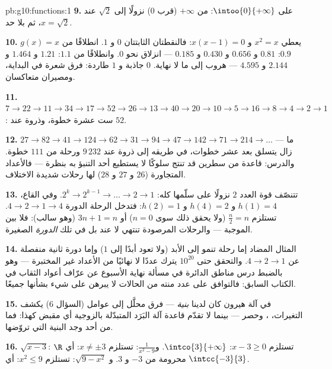 \begin{solution}{pb:g10:functions:1}
\textbf{9.} على $\intoo{0}{+\infty}$:  من
$+\infty$ (قرب $0$) نزولًا إلى  $\sqrt2$ عند
$x = \sqrt2$، ثم  بلا حد.

\textbf{10.} $g(x) = x$ يعطي $x^2 = x$ و $x(x - 1) = 0$: فالنقطتان
الثابتتان $0$ و $1$. انطلاقًا من $0.9$: $0.81$ و $0.656$ و $0.430$ و
$0.185$ --- انزلاق نحو $0$. وانطلاقًا من $1.1$: $1.21$ و $1.464$ و
$2.144$ و $4.595$ --- هروب إلى ما لا نهاية.  $0$
جاذبة و $1$ طاردة: فرق شعرة في البداية، ومصيران
متعاكسان.

\textbf{11.} $7 \to 22 \to 11 \to 34 \to 17 \to 52 \to 26 \to
13 \to 40 \to 20 \to 10 \to 5 \to 16 \to 8 \to 4 \to 2 \to 1$:
ست عشرة خطوة، وذروة عند $52$.

\textbf{12.} $27 \to 82 \to 41 \to 124 \to 62 \to 31 \to 94 \to
47 \to 142 \to 71 \to 214 \to \dots$ --- ما زال يتسلق بعد
عشر خطوات، في طريقه إلى ذروة عند $9\,232$ ورحلة من
$111$ خطوة. والدرس: قاعدة من سطرين قد تنتج سلوكًا لا يستطيع أحد
التنبؤ به بنظرة --- فالأعداد المتجاورة ($26$ و $27$ و $28$)
لها رحلات شديدة الاختلاف.

\textbf{13.} تتنصّف قوة العدد $2$ نزولًا على سلّمها كله:
$2^k \to 2^{k-1} \to \dots \to 2 \to 1$. وفي القاع،
$h(1) = 4$ و $h(4) = 2$ و $h(2) = 1$: فتدخل الرحلة الدورة
$4 \to 2 \to 1 \to 4$.  تستلزم $\frac n2 = n$
(ولا يحقق ذلك سوى $n = 0$) أو $3n + 1 = n$ (وهو سالب): فلا  بين
 الموجبة --- والرحلات المرصودة تنتهي لا عند  بل في تلك \emph{الدورة} الصغيرة.

\textbf{14.} المثال المضاد إما رحلة تنمو
إلى الأبد (ولا تعود أبدًا إلى $1$) وإما دورة ثانية
منفصلة عن $4 \to 2 \to 1$. والتحقق حتى $10^{20}$
يترك عددًا لا نهائيًا من الأعداد غير المختبرة --- وهو بالضبط
درس مناطق الدائرة في مسألة نهاية الأسبوع عن عرّاف أعواد الثقاب في الكتاب السابق: فالتوافق على
عدد منته من الحالات لا يبرهن على شيء بشأنها جميعًا.

\textbf{15.} في آلة هيرون كان لدينا \emph{بنية} --- فرق
محلَّل إلى عوامل (السؤال 6) يكشف التغيرات، ، وحصر --- بينما لا تقدّم قاعدة آلة البَرَد المتبدّلة
بالزوجية أي مقبض كهذا: فما من أحد وجد البنية التي
تروّضها.

\textbf{16.} $\sqrt{x - 3}$: تستلزم $x - 3 \geq 0$:
$\intco{3}{+\infty}$. و$\frac{1}{x^2 - 9}$: تستلزم
$x \neq \pm 3$: أي $\R$ محرومة من $-3$ و $3$.
و $\sqrt{9 - x^2}$: تستلزم $x^2 \leq 9$: أي $\intcc{-3}{3}$.


\end{solution}
